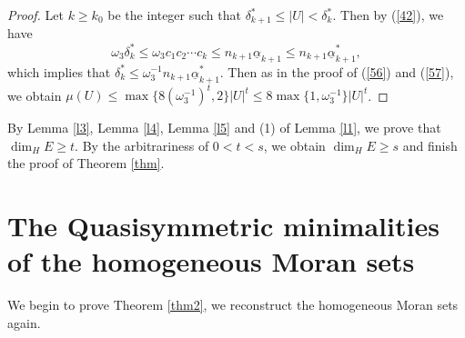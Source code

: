\documentclass[reqno]{amsart}
\theoremstyle{plain}
\theoremstyle{definition}
\theoremstyle{remark}
\numberwithin{equation}{section} \DeclareMathOperator\intr{int}
\begin{document}
\begin{proof}
Let $k\ge k_0$ be the integer such that $\delta^*_{k+1}\le \left | U \right | <\delta^*_k$. Then by (\ref{42}), we have
\begin{equation}
\omega_3\delta^*_k\le \omega_3c_1c_2\cdots c_{k}\le n_{k+1}\underline{\alpha}_{k+1}\le n_{k+1}\underline{\alpha}^*_{k+1},\nonumber
\end{equation}
which implies that $\delta^*_k\le \omega_3^{-1}n_{k+1}\underline{\alpha}^*_{k+1}$.
Then as in the proof of (\ref{56}) and (\ref{57}), we obtain
$\mu(U)\le \max\{8(\omega^{-1}_{3})^{t},2\}\left| U \right|^{t}\le 8\max\{1,\omega_3^{-1}\}\left | U \right |^t$.

\end{proof}


By Lemma \ref{l3}, Lemma \ref{l4}, Lemma \ref{l5} and (1) of Lemma \ref{l1}, we prove that
$\dim_{H}E\ge t$. By the arbitrariness of $0<t<s$, we obtain  $\dim_{H}E\ge s$ and  finish the proof of Theorem \ref{thm}.



\bigskip


\section{The  Quasisymmetric  minimalities of the homogeneous Moran sets}
We begin to prove Theorem \ref{thm2}, we reconstruct the homogeneous Moran sets again.
\end{document}
